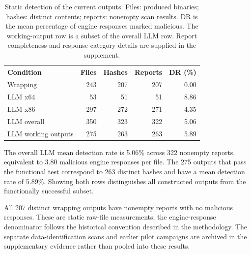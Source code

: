 \begin{table}[!htbp]
\caption{Static detection of the current outputs. Files: produced binaries;
hashes: distinct contents; reports: nonempty scan results. DR is the mean
percentage of engine responses marked malicious.
The working-output row is a subset of the overall LLM row. Report
completeness and response-category details are supplied in the supplement.}
\label{tab:current_scans}
\centering\small\setlength{\tabcolsep}{6pt}
\begin{tabular}{@{}lrrrr@{}}
\toprule
Condition & Files & Hashes & Reports & DR (\%) \\
\midrule
Wrapping & 243 & 207 & 207 & 0.00 \\
LLM x64 & 53 & 51 & 51 & 8.86 \\
LLM x86 & 297 & 272 & 271 & 4.35 \\
\midrule
LLM overall & 350 & 323 & 322 & 5.06 \\
LLM working outputs & 275 & 263 & 263 & 5.89 \\
\bottomrule
\end{tabular}
\end{table}

The overall LLM mean detection rate is 5.06\% across 322 nonempty reports,
equivalent to 3.80 malicious engine responses per file. The 275 outputs
that pass the functional test correspond to 263 distinct hashes and have
a mean detection rate of 5.89\%. Showing both rows distinguishes all
constructed outputs from the functionally successful subset.

All 207 distinct wrapping outputs have nonempty reports with no malicious
responses. These are static raw-file measurements; the engine-response
denominator follows the historical convention described in the methodology.
The separate data-identification scans and earlier pilot campaigns are
archived in the supplementary evidence rather than pooled into these results.
